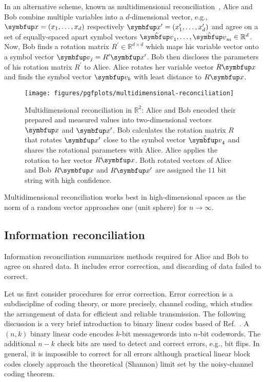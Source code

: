 In an alternative scheme, known as multidimensional reconciliation~\cite{Leverrier2008}, Alice and Bob combine multiple variables into a $d$-dimensional vector, e.g., $\vb{x}=(x_1,\dots,x_d)$ respectively $\vb{x}^\prime=(x_1^\prime,\dots,x_d^\prime)$ and agree on a set of equally-spaced apart symbol vectors $\vu{v}_1,\dots,\vu{v}_m\in\mathbb{R}^d$.
Now, Bob finds a rotation matrix $R^\prime\in\mathbb{R}^{d\times d}$ which maps his variable vector onto a symbol vector $\vb{v}_j=R^\prime\vb{x}^\prime$.
Bob then discloses the parameters of his rotation matrix $R^\prime$ to Alice.
Alice rotates her variable vector $R\vb{x}$ and finds the symbol vector $\vb{v}_k$ with least distance to $R\vb{x}$.
\begin{figure}[htb]
	\centering
	\texttt{[image: figures/pgfplots/multidimensional-reconciliation]}
	\caption{Multidimensional reconciliation in $\mathbb{R}^2$: Alice and Bob encoded their prepared and measured values into two-dimensional vectors $\vb{x}$ and $\vb{x}^\prime$. Bob calculates the rotation matrix $R$ that rotates $\vb{x}^\prime$ close to the symbol vector $\vu{v}_4$ and shares the rotational parameters with Alice. Alice applies the rotation to her vector $R\vb{x}$. Both rotated vectors of Alice and Bob $R\vb{x}$ and $R\vb{x}^\prime$ are assigned the $11$ bit string with high confidence.}\label{fig:multidimensional_reconciliation}
\end{figure}
Multidimensional reconciliation works best in high-dimensional spaces as the norm of a random vector approaches one (unit sphere) for $n\to\infty$.

\FloatBarrier
\subsection{Information reconciliation}

Information reconciliation summarizes methods required for Alice and Bob to agree on shared data.
It includes error correction, and discarding of data failed to correct.

Let us first consider procedures for error correction.
Error correction is a subdiscipline of coding theory, or more precisely, channel coding, which studies the arrangement of data for efficient and reliable transmission.
The following discussion is a very brief introduction to binary linear codes based of Ref.~\cite{MacKay2003,Mildenberger2013}.
A $(n,k)$ binary linear code encodes $k$-bit messagewords into $n$-bit codewords.
The additional $n-k$ check bits are used to detect and correct errors, e.g., bit flips.
In general, it is impossible to correct for all errors although practical linear block codes closely approach the theoretical (Shannon) limit set by the noisy-channel coding theorem.

